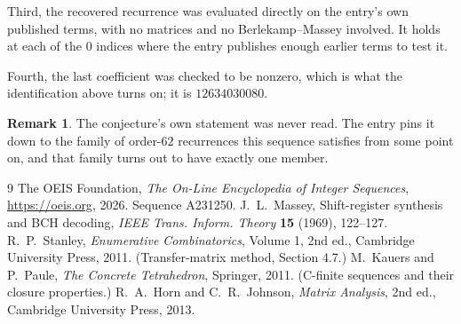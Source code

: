 \documentclass[11pt,a4paper]{article}
\theoremstyle{plain}
\theoremstyle{definition}
\newtheorem{remark}[theorem]{Remark}
\begin{document}
Third, the recovered recurrence was evaluated directly on the entry's own published terms, with
no matrices and no Berlekamp--Massey involved. It holds at each of the $0$ indices where
the entry publishes enough earlier terms to test it.

Fourth, the last coefficient was checked to be nonzero, which is what the identification above
turns on; it is $12634030080$.

\begin{remark}
The conjecture's own statement was never read. The entry pins it down to the family of
order-$62$ recurrences this sequence satisfies from some point on, and that family turns
out to have exactly one member.
\end{remark}

\begin{thebibliography}{9}
 The OEIS Foundation, \emph{The On-Line Encyclopedia of Integer
Sequences}, \url{https://oeis.org}, 2026. Sequence A231250.
 J.~L.~Massey, Shift-register synthesis and BCH decoding, \emph{IEEE
Trans. Inform. Theory} \textbf{15} (1969), 122--127.
 R.~P.~Stanley, \emph{Enumerative Combinatorics}, Volume 1, 2nd ed.,
Cambridge University Press, 2011. (Transfer-matrix method, Section 4.7.)
 M.~Kauers and P.~Paule, \emph{The Concrete Tetrahedron}, Springer, 2011.
(C-finite sequences and their closure properties.)
 R.~A.~Horn and C.~R.~Johnson, \emph{Matrix Analysis}, 2nd ed., Cambridge
University Press, 2013.
\end{thebibliography}
\end{document}
